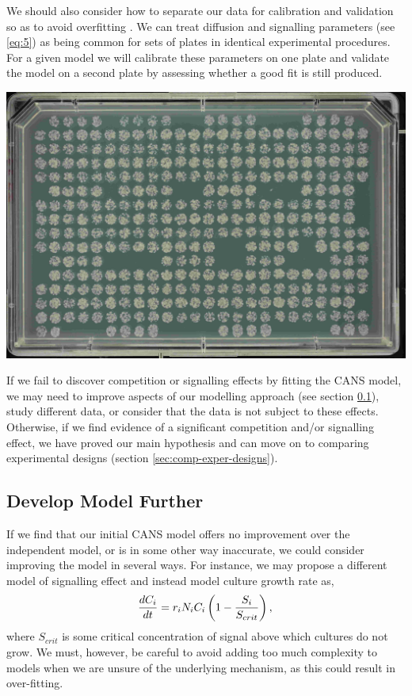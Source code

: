 We should also consider how to separate our data for calibration and
validation so as to avoid overfitting \citep{Hawkins2004}. We can treat
diffusion and signalling parameters (see \ref{eq:5}) as being common
for sets of plates in identical experimental procedures. For a given
model we will calibrate these parameters on one plate and validate the
model on a second plate by assessing whether a good fit is still
produced.

\begin{Figure}
  \centering
  \includegraphics[width=\linewidth]{DLR00012647-2009-07-02_23-12-49}
  \label{fig:gaps}
\end{Figure}

If we fail to discover competition or signalling effects by fitting
the CANS model, we may need to improve aspects of our modelling
approach (see section \ref{sec:dev-mod-further}), study different
data, or consider that the data is not subject to these
effects. Otherwise, if we find evidence of a significant competition
and/or signalling effect, we have proved our main hypothesis and can
move on to comparing experimental designs (section
\ref{sec:comp-exper-designs}).

\subsection{Develop Model Further}
\label{sec:dev-mod-further}
If we find that our initial CANS model offers no improvement over the
independent model, or is in some other way inaccurate, we could
consider improving the model in several ways. For instance, we may
propose a different model of signalling effect and instead model
culture growth rate as,
\begin{equation}
  \label{eq:7}
  \frac{dC_{i}}{dt} = r_{i}N_{i}C_{i}\left(1 - \frac{S_{i}}{S_{crit}}\right),\\
\end{equation}
where \(S_{crit}\) is some critical concentration of signal above
which cultures do not grow. We must, however, be careful to avoid
adding too much complexity to models when we are unsure of the
underlying mechanism, as this could result in over-fitting.


